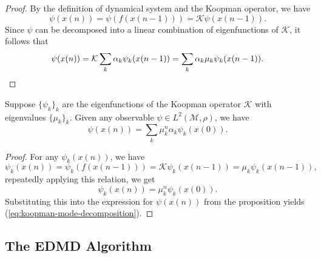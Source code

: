 \begin{proof}
  By the definition of dynamical system and
  the Koopman operator,
  we have
  \begin{equation*}
    \psi(x(n)) = \psi(f(x(n-1))) = \mathcal{K} \psi(x(n-1)).
  \end{equation*}
  Since $\psi$ can be decomposed into a linear combination of
  eigenfunctions of $\mathcal{K}$, it follows that
  \begin{equation*}
    \psi(x(n)) = \mathcal{K} \sum\limits_k \alpha_k \psi_k(x(n-1))
    = \sum\limits_k \alpha_k \mu_k \psi_k(x(n-1)).  \qedhere
  \end{equation*}
\end{proof}

\begin{corollary}
  Suppose $\{\psi_k\}_k$ are the eigenfunctions of
  the Koopman operator $\mathcal{K}$
  with eigenvalues $\{\mu_k\}_k$.
  Given any observable $\psi \in L^2(\mathcal{M}, \rho)$,
  we have
  \begin{equation}
    \label{eq:koopman-mode-decomposition}
    \psi(x(n)) = \sum\limits_k \mu_k^n \alpha_k \psi_k(x(0)).
  \end{equation}
\end{corollary}

\begin{proof}
  For any $\psi_k(x(n))$, we have
  \begin{equation*}
    \psi_k(x(n)) = \psi_k(f(x(n-1)))
    = \mathcal{K}\psi_k(x(n-1))
    = \mu_k\psi_k(x(n-1)),
  \end{equation*}
  repeatedly applying this relation, we get
  \begin{equation*}
    \psi_k(x(n)) = \mu_k^n \psi_k(x(0)).
  \end{equation*}
  Substituting this into the expression for $\psi(x(n))$
  from the proposition yields (\ref{eq:koopman-mode-decomposition}).
\end{proof}

\subsection{The EDMD Algorithm}

